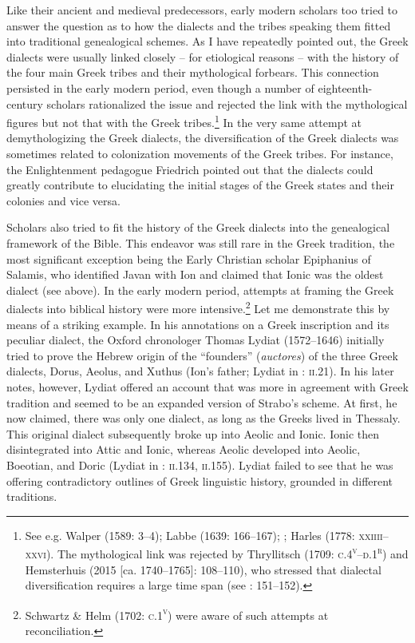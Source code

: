 Like their ancient and medieval predecessors, early modern scholars too tried to answer the question as to how the dialects and the tribes speaking them fitted into traditional genealogical schemes. As I have repeatedly pointed out, the Greek dialects were usually linked closely – for etiological reasons – with the history of the four main Greek tribes and their mythological forbears. This connection persisted in the early modern period, even though a number of eighteenth-century scholars rationalized the issue and rejected the link with the mythological figures but not that with the Greek tribes.\footnote{See e.g. Walper (1589: 3–4); Labbe (1639: 166–167); \citet[73]{Vitringa1689}; Harles (1778: \textsc{xxiiii–xxvi}). The mythological link was rejected by Thryllitsch (1709: \textsc{c.4}\textsc{\textsuperscript{v}}\textsc{–d.1}\textsc{\textsuperscript{r}}) and Hemsterhuis (2015 [ca. 1740–1765]: 108–110), who stressed that dialectal diversification requires a large time span (see \citealt{Gerretzen1940}: 151–152).} In the very same attempt at demythologizing the Greek dialects, the diversification of the Greek dialects was sometimes related to colonization movements of the Greek tribes. For instance, the Enlightenment pedagogue Friedrich \citet[12]{Gedike1782} pointed out that the dialects could greatly contribute to elucidating the initial stages of the Greek states and their colonies and vice versa.

Scholars also tried to fit the history of the Greek dialects into the genealogical framework of the Bible. This endeavor was still rare in the Greek tradition, the most significant exception being the Early Christian scholar Epiphanius of Salamis, who identified Javan with Ion and claimed that Ionic was the oldest dialect (see  above). In the early modern period, attempts at framing the Greek dialects into biblical history were more intensive.\footnote{Schwartz \& Helm (1702: \textsc{c.1}\textsc{\textsuperscript{v}}) were aware of such attempts at reconciliation.} Let me demonstrate this by means of a striking example. In his annotations on a Greek inscription and its peculiar dialect, the Oxford chronologer Thomas Lydiat (1572–1646) initially tried to prove the Hebrew origin of the “founders” (\textit{auctores}) of the three Greek dialects, Dorus, Aeolus, and Xuthus (Ion’s father; Lydiat in \citealt{Prideaux1676}: \textsc{ii}.21). In his later notes, however, Lydiat offered an account that was more in agreement with Greek tradition and seemed to be an expanded version of Strabo’s scheme. At first, he now claimed, there was only one dialect, as long as the Greeks lived in Thessaly. This original dialect subsequently broke up into Aeolic and Ionic. Ionic then disintegrated into Attic and Ionic, whereas Aeolic developed into Aeolic, Boeotian, and Doric (Lydiat in \citealt{Prideaux1676}: \textsc{ii.134}, \textsc{ii.}155). Lydiat failed to see that he was offering contradictory outlines of Greek linguistic history, grounded in different traditions.

